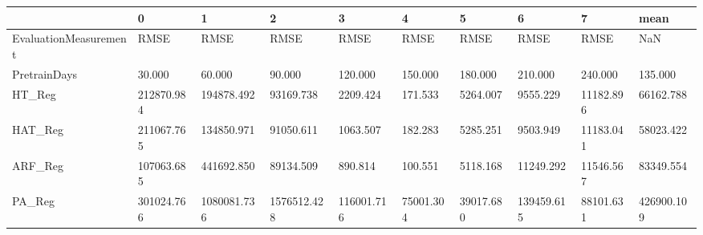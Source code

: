 \begin{tabular}{llllllllll}
\toprule
{} &          0 &           1 &           2 &          3 &         4 &         5 &          6 &         7 &       mean \\
\midrule
EvaluationMeasurement &       RMSE &        RMSE &        RMSE &       RMSE &      RMSE &      RMSE &       RMSE &      RMSE &        NaN \\
PretrainDays          &     30.000 &      60.000 &      90.000 &    120.000 &   150.000 &   180.000 &    210.000 &   240.000 &    135.000 \\
HT\_Reg                & 212870.984 &  194878.492 &   93169.738 &   2209.424 &   171.533 &  5264.007 &   9555.229 & 11182.896 &  66162.788 \\
HAT\_Reg               & 211067.765 &  134850.971 &   91050.611 &   1063.507 &   182.283 &  5285.251 &   9503.949 & 11183.041 &  58023.422 \\
ARF\_Reg               & 107063.685 &  441692.850 &   89134.509 &    890.814 &   100.551 &  5118.168 &  11249.292 & 11546.567 &  83349.554 \\
PA\_Reg                & 301024.766 & 1080081.736 & 1576512.428 & 116001.716 & 75001.304 & 39017.680 & 139459.615 & 88101.631 & 426900.109 \\
\bottomrule
\end{tabular}
